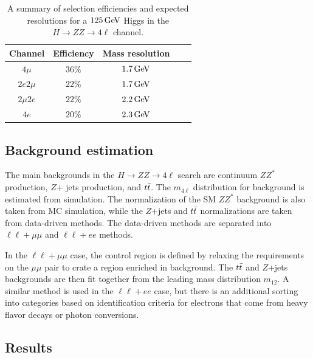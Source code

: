 \begin{table}[h!]
\centering
\captionsetup{justification=centering}

\hspace{-10pt}
\begin{tabular}{|c|c|c|c|c|}
\hline
Channel & Efficiency & Mass resolution \\ \hline
$4\mu$ & $36\%$ & $1.7 \GeV$ \\ \hline
$2e2\mu$ & $22\%$ & $1.7 \GeV$ \\ \hline
$2\mu2e$ & $22\%$ & $2.2\GeV$ \\ \hline
$4e$ & $20\%$ & $2.3\GeV$ \\ \hline 
\end{tabular}

\caption{
A summary of selection efficiencies and expected resolutions for a $125 \GeV$ Higgs in the $H\to ZZ\to 4\ell$ channel\cite{Discovery}. 
}
\label{tab:disc_zz_summary}
\end{table}

\subsection{Background estimation}

The main backgrounds in the $H\to ZZ \to 4\ell$ search are continuum $ZZ^*$ production, $Z$+ jets production, and $t\bar{t}$. The $m_{4\ell}$ distribution for background is estimated from simulation. The normalization of the SM $ZZ^*$ background is also taken from MC simulation, while the $Z$+jets and $t\bar{t}$ normalizations are taken from data-driven methods. The data-driven methods are separated into $\ell\ell+\mu\mu$ and $\ell\ell+ee$ methods. 

In the $\ell\ell+\mu\mu$ case, the control region is defined by relaxing the requirements on the $\mu\mu$ pair to crate a region enriched in background. The $t\bar{t}$ and $Z$+jets backgrounds are then fit together from the leading mass distribution $m_{12}$. A similar method is used in the $\ell\ell+ee$ case, but there is an additional sorting into categories based on identification criteria for electrons that come from heavy flavor decays or photon conversions. 

\subsection{Results}


